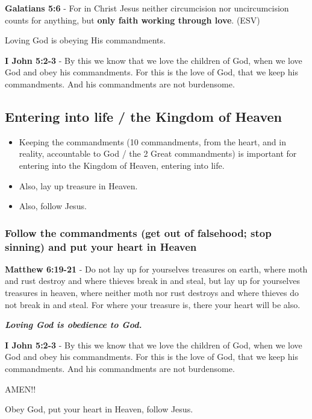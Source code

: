 \documentclass[11pt]{article}
\begin{document}
\textbf{Galatians 5:6} - For in Christ Jesus neither circumcision nor uncircumcision counts for anything, but \textbf{only faith working through love}. (ESV)

Loving God is obeying His commandments.

\textbf{I John 5:2-3} - By this we know that we love the children of God, when we love God and obey his commandments. For this is the love of God, that we keep his commandments. And his commandments are not burdensome.

\subsection{Entering into life / the Kingdom of Heaven}
\label{sec:org425dd07}
\begin{itemize}
\item Keeping the commandments (10 commandments, from the heart, and in reality, accountable to God / the 2 Great commandments) is important for entering into the Kingdom of Heaven, entering into life.
\item Also, lay up treasure in Heaven.
\item Also, follow Jesus.
\end{itemize}

\subsubsection{Follow the commandments (get out of falsehood; stop sinning) and put your heart in Heaven}
\label{sec:org035f7f7}
\textbf{Matthew 6:19-21} - Do not lay up for yourselves treasures on earth, where moth and rust destroy and where thieves break in and steal, but lay up for yourselves treasures in heaven, where neither moth nor rust destroys and where thieves do not break in and steal. For where your treasure is, there your heart will be also.

\emph{\textbf{Loving God is obedience to God.}}

\textbf{I John 5:2-3} - By this we know that we love the children of God, when we love God and obey his commandments. For this is the love of God, that we keep his commandments. And his commandments are not burdensome.

AMEN!!

Obey God, put your heart in Heaven, follow Jesus.
\end{document}
